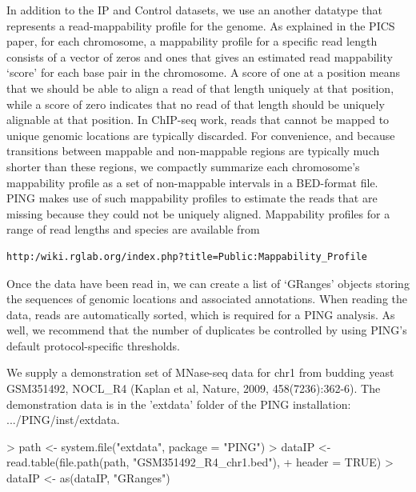\documentclass[11pt]{article}
\begin{document}
In addition to the IP and Control datasets, we use an another datatype that represents a read-mappability profile for the genome. 
As explained in the PICS paper, for each chromosome, a mappability profile for a specific read length consists of a vector of zeros and ones that gives an estimated read mappability `score' for each base pair in the chromosome. A score of one at a position means that we should be able to align a read of that length uniquely at that position, while a score of zero indicates that no read of that length should be uniquely alignable at that position. In ChIP-seq work, reads that cannot be mapped to unique genomic locations are typically discarded. For convenience, and because transitions between mappable and non-mappable regions are typically much shorter than these regions, we compactly summarize each chromosome's mappability profile as a set of 
non-mappable intervals in a BED-format file. 
PING makes use of such mappability profiles to estimate the reads that are missing because they could not be uniquely aligned. 
Mappability profiles for a range of read lengths and species are available from \begin{verbatim}
http:/wiki.rglab.org/index.php?title=Public:Mappability_Profile
\end{verbatim}


Once the data have been read in, we can create a list of `GRanges' objects storing the sequences of genomic locations and associated annotations. When reading the data, reads are automatically sorted, which is required for a PING analysis. As well, we recommend that the number of duplicates be controlled by using PING's default protocol-specific thresholds.

We supply a demonstration set of MNase-seq data for chr1 from budding yeast GSM351492, NOCL\_R4 (Kaplan et al, Nature, 2009, 458(7236):362-6). The demonstration data is in the 'extdata' folder of the PING installation:  .../PING/inst/extdata.

\begin{Schunk}
\begin{Sinput}
> path <- system.file("extdata", package = "PING")
> dataIP <- read.table(file.path(path, "GSM351492_R4_chr1.bed"), 
+     header = TRUE)
> dataIP <- as(dataIP, "GRanges")
\end{Sinput}
\end{Schunk}

\end{document}
